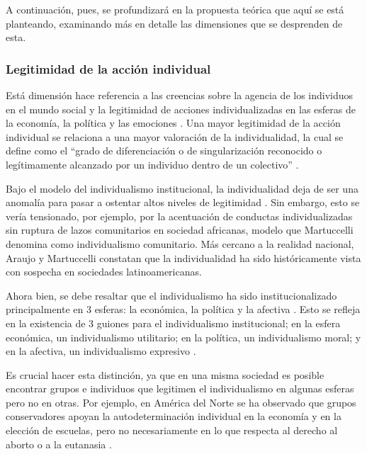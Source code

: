 \documentclass[12pt,twoside]{templates/facsothesis}
\begin{document}
A continuación, pues, se profundizará en la propuesta teórica que aquí se está planteando, examinando más en detalle las dimensiones que se desprenden de esta.

\hypertarget{legitimidad-de-la-acciuxf3n-individual}{%
\subsubsection*{Legitimidad de la acción individual}\label{legitimidad-de-la-acciuxf3n-individual}}

Está dimensión hace referencia a las creencias sobre la agencia de los individuos en el mundo social \citep{brewer2007} y la legitimidad de acciones individualizadas en las esferas de la economía, la política y las emociones \citep{cortois2018}. Una mayor legitimidad de la acción individual se relaciona a una mayor valoración de la individualidad, la cual se define como el ``grado de diferenciación o de singularización reconocido o legítimamente alcanzado por un individuo dentro de un colectivo'' \citep[p.~10]{martuccelli2018}.

Bajo el modelo del individualismo institucional, la individualidad deja de ser una anomalía para pasar a ostentar altos niveles de legitimidad \citep{martuccelli2018}. Sin embargo, esto se vería tensionado, por ejemplo, por la acentuación de conductas individualizadas sin ruptura de lazos comunitarios en sociedad africanas, modelo que Martuccelli \citeyearpar{martuccelli2018} denomina como individualismo comunitario. Más cercano a la realidad nacional, Araujo y Martuccelli \citeyearpar{araujo2020a} constatan que la individualidad ha sido históricamente vista con sospecha en sociedades latinoamericanas.

Ahora bien, se debe resaltar que el individualismo ha sido institucionalizado principalmente en 3 esferas: la económica, la política y la afectiva \citep{cortois2018, martuccelli2018}. Esto se refleja en la existencia de 3 guiones para el individualismo institucional; en la esfera económica, un individualismo utilitario; en la política, un individualismo moral; y en la afectiva, un individualismo expresivo \citep{cortois2018}.

Es crucial hacer esta distinción, ya que en una misma sociedad es posible encontrar grupos e individuos que legitimen el individualismo en algunas esferas pero no en otras. Por ejemplo, en América del Norte se ha observado que grupos conservadores apoyan la autodeterminación individual en la economía y en la elección de escuelas, pero no necesariamente en lo que respecta al derecho al aborto o a la eutanasia \citep{kemmelmeier2003}.
\end{document}
